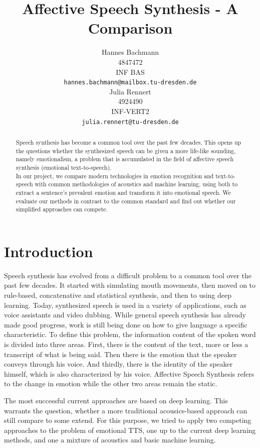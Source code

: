 \documentclass[11pt]{article}
\title{Affective Speech Synthesis - A Comparison}
\author{Hannes Bachmann\\
  4847472\\
  INF BAS \\
  \texttt{\small hannes.bachmann@mailbox.tu-dresden.de}
  \\ \And
  Julia Rennert \\
  4924490\\
  INF-VERT2 \\
  \texttt{\small julia.rennert@tu-dresden.de}
  }
\begin{document}
\maketitle
\begin{abstract}
Speech synthesis has become a common tool over the past few decades. This opens up the questions whether the synthesized speech can be given a more life-like sounding, namely emotionalism, a problem that is accumulated in the field of affective speech synthesis (emotional text-to-speech). \\
In our project, we compare modern technologies in emotion recognition and text-to-speech with common methodologies of acoustics and machine learning, using both to extract a sentence's prevalent emotion and transform it into emotional speech. We evaluate our methods in contrast to the common standard and find out whether our simplified approaches can compete.
\end{abstract}

\section{Introduction}
Speech synthesis has evolved from a difficult problem to a common tool over the past few decades.
It started with simulating mouth movements, then moved on to rule-based, concatenative and
statistical synthesis, and then to using deep learning. Today, synthesized speech is used in a
variety of applications, such as voice assistants and video dubbing.
While general speech synthesis has already made good progress, work is still being done on
how to give language a specific characteristic. To define this problem, the information content of
the spoken word is divided into three areas. First, there is the content of the text, more or less
a transcript of what is being said. Then there is the emotion that the speaker conveys through
his voice. And thirdly, there is the identity of the speaker himself, which is also characterized by
his voice. Affective Speech Synthesis refers to the change in emotion while the other two areas remain the static.

The most successful current approaches are based on deep learning\cite{triantafyllopoulos_overview_2023, cho_multi-speaker_2021, diatlova_emospeech_2023}. This warrants the question, whether a more traditional acousics-based approach can still compare to some extend. For this purpose, we tried to apply two competing approaches to the problem of emotional TTS, one up to the current deep learning methods, and one a mixture of acoustics and basic machine learning. 
\end{document}
